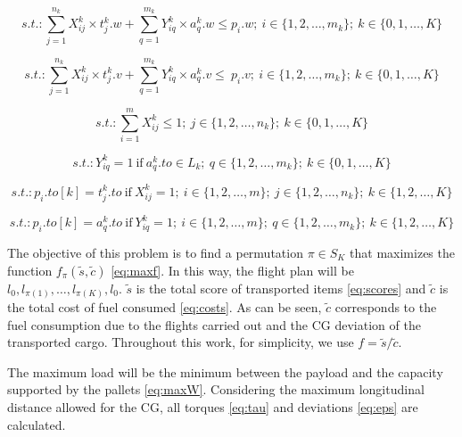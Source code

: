 \documentclass[preprint,authoryear]{elsarticle}
\begin{document}
\begin{equation} \label{eq:app2}
	s.t.: \sum_{j=1}^{n_k} X_{ij}^k \times t_j^k.w + \sum_{q=1}^{m_k} Y_{iq}^k \times a_q^k.w  \leq p_i.w; \ i \in \{1, 2, \ldots, m_k\}; \ k \in \{0, 1, \ldots, K\}
\end{equation}

\begin{equation} \label{eq:app3}
	s.t.: \sum_{j=1}^{n_k} X_{ij}^k \times t_j^k.v + \sum_{q=1}^{m_k} Y_{iq}^k \times a_q^k.v  \leq\ p_i.v; \ i \in \{1, 2, \ldots, m_k\}; \ k \in \{0, 1, \ldots, K\}
\end{equation}

\begin{equation} \label{eq:app4}
	s.t.: \sum_{i=1}^{m} X_{ij}^k \leq 1; \ j \in \{1, 2, \ldots, n_k\}; \ k \in \{0, 1, \ldots, K\}
\end{equation}

\begin{equation} \label{eq:app5}
	s.t.:  Y_{iq}^k = 1 \ \mbox{if} \ a^k_q.to \in L_k; \ q \in \{1, 2, \ldots, m_k\}; \ k \in \{0, 1, \ldots, K\}
\end{equation}

\begin{equation} \label{eq:pdp8}
	s.t.: p_i.to[k] = t^k_j.to\ \mbox{if} \ X_{ij}^k = 1; \ i \in \{1, 2, \ldots, m\}; \ j \in \{1, 2, \ldots, n_k\}; \ k \in \{1, 2, \ldots, K\}
\end{equation}

\begin{equation} \label{eq:pdp2}
	s.t.:  p_i.to[k] = a^k_q.to\ \mbox{if} \ Y_{iq}^k = 1; \ i \in \{1, 2, \ldots, m\};\ q \in \{1, 2, \ldots, m_k\}; \ k \in \{1, 2, \ldots, K\}
\end{equation}


The objective of this problem is to find a permutation $\pi \in S_K$\/ that maximizes the function $f_\pi(\tilde{s},\tilde{c})$ \ref{eq:maxf}. In this way, the flight plan will be $l_0, l_{\pi(1)}, \ldots, l_{\pi(K)}, l_0$. $\tilde{s}$\/ is the total score of transported items \ref{eq:scores} and  $\tilde{c}$\/ is the total cost of fuel consumed \ref{eq:costs}. As can be seen, $\tilde{c}$\/ corresponds to the fuel consumption due to the flights carried out and the CG deviation of the transported cargo. Throughout this work, for simplicity, we use $f=\tilde{s}/\tilde{c}$.

The maximum load will be the minimum between the payload and the capacity supported by the pallets \ref{eq:maxW}. Considering the maximum longitudinal distance allowed for the CG, all torques \ref{eq:tau} and deviations \ref{eq:eps} are calculated.
\end{document}
